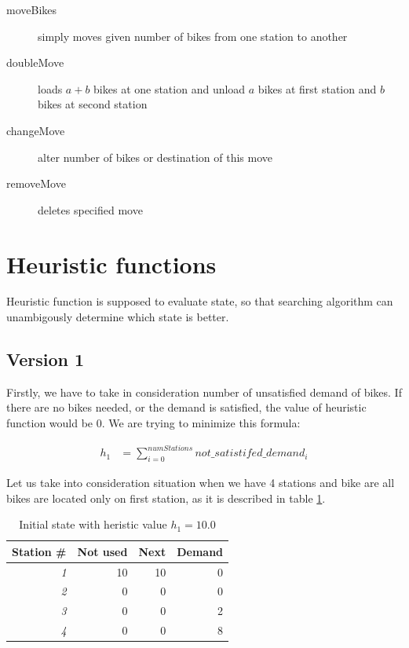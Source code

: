 \documentclass[11pt,twoside,a4paper]{mr}%
\begin{document}
\begin{description}
 \item[moveBikes] simply moves given number of bikes from one station to another
\item[doubleMove] loads \( a + b \) bikes at one station and unload \(a\) bikes at first station and \(b\) bikes at second station
\item[changeMove] alter number of bikes or destination of this move
\item[removeMove] deletes specified move
 \end{description}

\section{Heuristic functions}
Heuristic function is supposed to evaluate state, so that searching algorithm can unambigously determine which state is better. 

\subsection{Version 1}
Firstly, we have to take in consideration number of unsatisfied demand of bikes. If there are no bikes needed, or the demand is satisfied, the value of heuristic function would be 0. We are trying to minimize this formula: 

\begin{align}
 h_1 &=\sum\limits_{i=0}^{numStations} not\_satistifed\_demand_i
\end{align}

Let us take into consideration situation when we have 4 stations and bike are all bikes are located only on first station, as it is described in table \ref{t:ex1a}.


\begin{table}[!t]
\renewcommand{\arraystretch}{1.1}

\begin{center}
\begin{tabular}[t]{|r|r|r|r|}
\hline
\bf Station \# & \bf Not used & \bf Next &\bf Demand\\ \hline\hline
\sl1 & 10 & 10 & 0\\ \hline
\sl2 & 0 & 0 & 0\\ \hline
\sl3 & 0 & 0 & 2\\ \hline
\sl4 & 0 & 0 & 8\\ \hline
\end{tabular}
\end{center}
\label{t:ex1a}
\caption{Initial state with heristic value \(h_1= 10.0\)}
\end{table}
\end{document}
